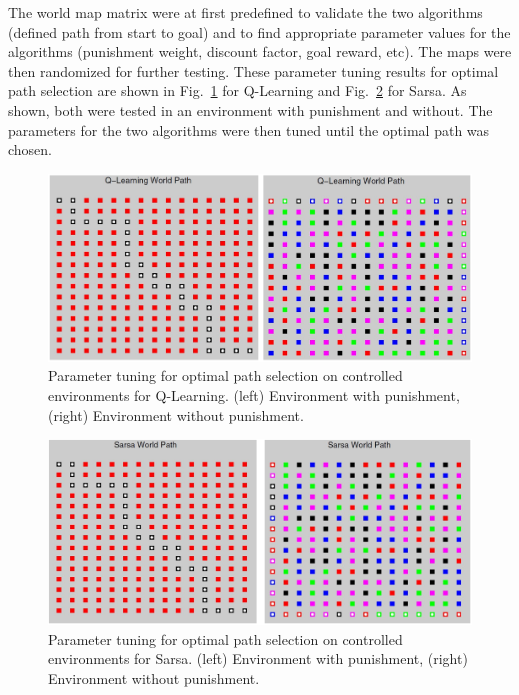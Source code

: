 \documentclass[12pt,american]{report}
\begin{document}
The world map matrix were at first predefined to validate the two algorithms (defined path from start to goal) and to find appropriate parameter values for the algorithms (punishment weight, discount factor, goal reward, etc).  The maps were then randomized for further testing. These parameter tuning results for optimal path selection are shown in Fig.~\ref{fig:qlearning-optimal} for Q-Learning and Fig.~\ref{fig:sarsa-optimal} for Sarsa.  As shown, both were tested in an environment with punishment and without.  The parameters for the two algorithms were then tuned until the optimal path was chosen.  
\begin{figure}
\centering
\includegraphics[scale=.75]{images/qlearning-optimal.png}
\caption{Parameter tuning for optimal path selection on controlled environments for Q-Learning. (left) Environment with punishment, (right) Environment without punishment.}
\label{fig:qlearning-optimal}
\end{figure}
\begin{figure}
\centering
\includegraphics[scale=.75]{images/sarsa-optimal.png}
\caption{Parameter tuning for optimal path selection on controlled environments for Sarsa. (left) Environment with punishment, (right) Environment without punishment.}
\label{fig:sarsa-optimal}
\end{figure}
\end{document}
